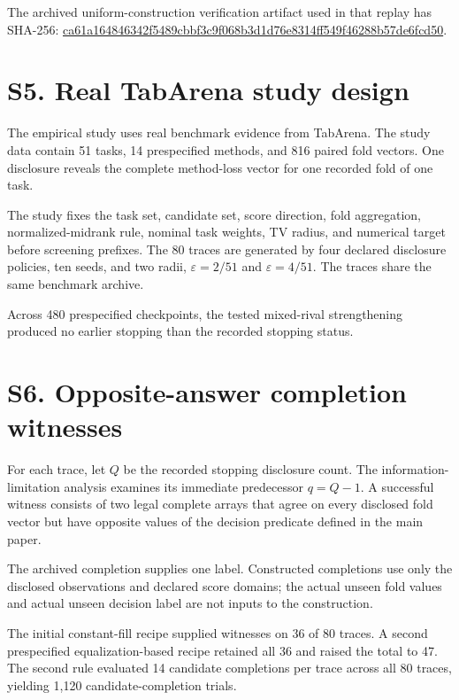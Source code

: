 \documentclass[11pt]{article}
\begin{document}
The archived uniform-construction verification artifact used in that replay has SHA-256: \url{ca61a164846342f5489cbbf3c9f068b3d1d76e8314ff549f46288b57de6fcd50}.

\section*{S5. Real TabArena study design}
The empirical study uses real benchmark evidence from TabArena. The study data contain 51 tasks, 14 prespecified methods, and 816 paired fold vectors. One disclosure reveals the complete method-loss vector for one recorded fold of one task.

The study fixes the task set, candidate set, score direction, fold aggregation, normalized-midrank rule, nominal task weights, TV radius, and numerical target before screening prefixes. The 80 traces are generated by four declared disclosure policies, ten seeds, and two radii, $\varepsilon=2/51$ and $\varepsilon=4/51$. The traces share the same benchmark archive.

Across 480 prespecified checkpoints, the tested mixed-rival strengthening produced no earlier stopping than the recorded stopping status.

\section*{S6. Opposite-answer completion witnesses}
For each trace, let $Q$ be the recorded stopping disclosure count. The information-limitation analysis examines its immediate predecessor $q=Q-1$. A successful witness consists of two legal complete arrays that agree on every disclosed fold vector but have opposite values of the decision predicate defined in the main paper.

The archived completion supplies one label. Constructed completions use only the disclosed observations and declared score domains; the actual unseen fold values and actual unseen decision label are not inputs to the construction.

The initial constant-fill recipe supplied witnesses on 36 of 80 traces. A second prespecified equalization-based recipe retained all 36 and raised the total to 47. The second rule evaluated 14 candidate completions per trace across all 80 traces, yielding 1,120 candidate-completion trials.
\end{document}
